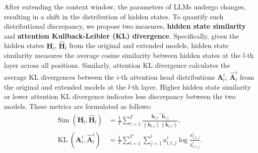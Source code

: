 After extending the context window, the parameters of LLMs undergo changes, resulting in a shift in the distribution of hidden states. To quantify such distributional discrepancy, we propose two measures, \ie \textbf{hidden state similarity} and \textbf{attention Kullback-Leibler (KL) divergence}. Specifically, given the hidden states $\mathbf{H}_l$, $\mathbf{\widehat{H}}_l$ from the original and extended models, hidden state similarity measures the average cosine similarity between hidden states at the $l$-th layer across all positions. Similarly, attention KL divergence calculates the average KL divergences between the $i$-th attention head distributions $\mathbf{A}^i_l$, $\mathbf{\widehat{A}}^i_l$ from the original and extended models at the $l$-th layer. Higher hidden state similarity or lower attention KL divergence indicates less discrepancy between the two models. These metrics are formulated as follows:
\begin{align}
    \operatorname{Sim}(\mathbf{H}_l, \mathbf{\widehat{H}}_l) &= \frac 1 T\sum_{t=1}^T \frac { {\bm{h}_{l,t}}^\intercal \bm{\widehat{h}}_{l,t}}{\lVert \bm h_{l,t}\rVert\lVert \bm{\widehat{h}}_{l,t}\rVert},\\
    \operatorname{KL}(\mathbf{A}_l^{i},\widehat{\mathbf{A}}_l^{i}) &= \frac 1 T \sum_{t=1}^T \sum_{j=1}^t a^{i}_{l,t,j} \log \frac {a^{i}_{l,t,j}}{\hat a^{i}_{l,t,j}}.
\end{align}



        
